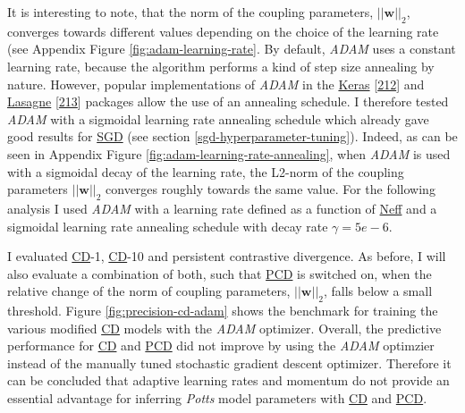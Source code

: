 \documentclass[11pt,a4paper,twoside]{book}
\newcommand{\eq}{\!=\!}
\newcommand{\w}{\mathbf{w}}
\theoremstyle{definition}
\theoremstyle{definition}
\theoremstyle{remark}
\begin{document}
It is interesting to note, that the norm of the coupling parameters,
\(||\w||_2\), converges towards different values depending on the choice
of the learning rate (see Appendix Figure \ref{fig:adam-learning-rate}.
By default, \emph{ADAM} uses a constant learning rate, because the
algorithm performs a kind of step size annealing by nature. However,
popular implementations of \emph{ADAM} in the
\href{https://github.com/fchollet/keras/blob/master/keras/optimizers.py\#L385}{Keras}
{[}\protect\hyperlink{ref-Chollet2015}{212}{]} and
\href{https://github.com/Lasagne/Lasagne/blob/master/lasagne/updates.py\#L565-L629}{Lasagne}
{[}\protect\hyperlink{ref-Dieleman2015}{213}{]} packages allow the use
of an annealing schedule. I therefore tested \emph{ADAM} with a
sigmoidal learning rate annealing schedule which already gave good
results for \protect\hyperlink{abbrev}{SGD} (see section
\ref{sgd-hyperparameter-tuning}). Indeed, as can be seen in Appendix
Figure \ref{fig:adam-learning-rate-annealing}, when \emph{ADAM} is used
with a sigmoidal decay of the learning rate, the L2-norm of the coupling
parameters \(||\w||_2\) converges roughly towards the same value. For
the following analysis I used \emph{ADAM} with a learning rate defined
as a function of \protect\hyperlink{abbrev}{Neff} and a sigmoidal
learning rate annealing schedule with decay rate \(\gamma \eq 5e-6\).




















I evaluated \protect\hyperlink{abbrev}{CD}-1,
\protect\hyperlink{abbrev}{CD}-10 and persistent contrastive divergence.
As before, I will also evaluate a combination of both, such that
\protect\hyperlink{abbrev}{PCD} is switched on, when the relative change
of the norm of coupling parameters, \(||\w||_2\), falls below a small
threshold. Figure \ref{fig:precision-cd-adam} shows the benchmark for
training the various modified \protect\hyperlink{abbrev}{CD} models with
the \emph{ADAM} optimizer. Overall, the predictive performance for
\protect\hyperlink{abbrev}{CD} and \protect\hyperlink{abbrev}{PCD} did
not improve by using the \emph{ADAM} optimzier instead of the manually
tuned stochastic gradient descent optimizer. Therefore it can be
concluded that adaptive learning rates and momentum do not provide an
essential advantage for inferring \emph{Potts} model parameters with
\protect\hyperlink{abbrev}{CD} and \protect\hyperlink{abbrev}{PCD}.
\end{document}
